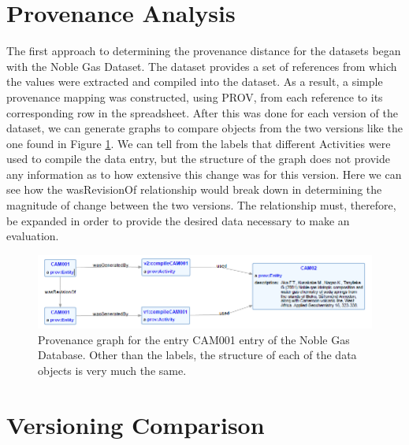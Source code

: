 \section{Provenance Analysis}

The first approach to determining the provenance distance for the datasets began with the Noble Gas Dataset.  The dataset provides a set of references from which the values were extracted and compiled into the dataset.  As a result, a simple provenance mapping was constructed, using PROV, from each reference to its corresponding row in the spreadsheet.  After this was done for each version of the dataset, we can generate graphs to compare objects from the two versions like the one found in Figure \ref{CAM001ProvGraph}.  We can tell from the labels that different Activities were used to compile the data entry, but the structure of the graph does not provide any information as to how extensive this change was for this version.  Here we can see how the wasRevisionOf relationship would break down in determining the magnitude of change between the two versions.  The relationship must, therefore, be expanded in order to provide the desired data necessary to make an evaluation.

\begin{figure}
	\centering
	\includegraphics[scale=0.70]{figures/CAM001v1v2.png}
	\caption{Provenance graph for the entry CAM001 entry of the Noble Gas Database.  Other than the labels, the structure of each of the data objects is very much the same.}
	\label{CAM001ProvGraph}
\end{figure}

\section{Versioning Comparison}

